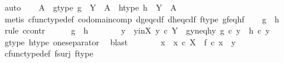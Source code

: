 \begin{isabellebody}
\ auto\isanewline
\ \ \isamarkupfalse%
\ A\ \ g{\isacharunderscore}{\kern0pt}type{\isacharcolon}{\kern0pt}\ {\isachardoublequoteopen}g\ {\isacharcolon}{\kern0pt}\ Y\ {\isasymrightarrow}\ A{\isachardoublequoteclose}\ \ h{\isacharunderscore}{\kern0pt}type{\isacharcolon}{\kern0pt}\ {\isachardoublequoteopen}h\ {\isacharcolon}{\kern0pt}\ Y\ {\isasymrightarrow}\ A{\isachardoublequoteclose}\isanewline
\ \ \ \ \isamarkupfalse%
\ {\isacharparenleft}{\kern0pt}metis\ cfunc{\isacharunderscore}{\kern0pt}type{\isacharunderscore}{\kern0pt}def\ codomain{\isacharunderscore}{\kern0pt}comp\ d{\isacharunderscore}{\kern0pt}g{\isacharunderscore}{\kern0pt}eq{\isacharunderscore}{\kern0pt}cd{\isacharunderscore}{\kern0pt}f\ d{\isacharunderscore}{\kern0pt}h{\isacharunderscore}{\kern0pt}eq{\isacharunderscore}{\kern0pt}cd{\isacharunderscore}{\kern0pt}f\ f{\isacharunderscore}{\kern0pt}type\ gf{\isacharunderscore}{\kern0pt}eq{\isacharunderscore}{\kern0pt}hf{\isacharparenright}{\kern0pt}\isanewline
\ \ \isamarkupfalse%
\ {\isachardoublequoteopen}g\ {\isacharequal}{\kern0pt}\ h{\isachardoublequoteclose}\isanewline
\ \ \isamarkupfalse%
\ {\isacharparenleft}{\kern0pt}rule\ ccontr{\isacharparenright}{\kern0pt}\isanewline
\ \ \ \ \isamarkupfalse%
\ {\isachardoublequoteopen}g\ {\isasymnoteq}\ h{\isachardoublequoteclose}\isanewline
\ \ \ \ \isamarkupfalse%
\ \isamarkupfalse%
\ y\ \ y{\isacharunderscore}{\kern0pt}in{\isacharunderscore}{\kern0pt}X{\isacharcolon}{\kern0pt}\ {\isachardoublequoteopen}y\ {\isasymin}\isactrlsub c\ Y{\isachardoublequoteclose}\ \ gy{\isacharunderscore}{\kern0pt}neq{\isacharunderscore}{\kern0pt}hy{\isacharcolon}{\kern0pt}\ {\isachardoublequoteopen}g\ {\isasymcirc}\isactrlsub c\ y\ {\isasymnoteq}\ h\ {\isasymcirc}\isactrlsub c\ y{\isachardoublequoteclose}\isanewline
\ \ \ \ \ \ \isamarkupfalse%
\ g{\isacharunderscore}{\kern0pt}type\ h{\isacharunderscore}{\kern0pt}type\ one{\isacharunderscore}{\kern0pt}separator\ \isamarkupfalse%
\ blast\isanewline
\ \ \ \ \isamarkupfalse%
\ \isamarkupfalse%
\ x\ \ {\isachardoublequoteopen}x\ {\isasymin}\isactrlsub c\ X{\isachardoublequoteclose}\ \ {\isachardoublequoteopen}f\ {\isasymcirc}\isactrlsub c\ x\ {\isacharequal}{\kern0pt}\ y{\isachardoublequoteclose}\isanewline
\ \ \ \ \ \ \isamarkupfalse%
\ cfunc{\isacharunderscore}{\kern0pt}type{\isacharunderscore}{\kern0pt}def\ f{\isacharunderscore}{\kern0pt}surj\ f{\isacharunderscore}{\kern0pt}type\ \isamarkupfalse%

\end{isabellebody}
